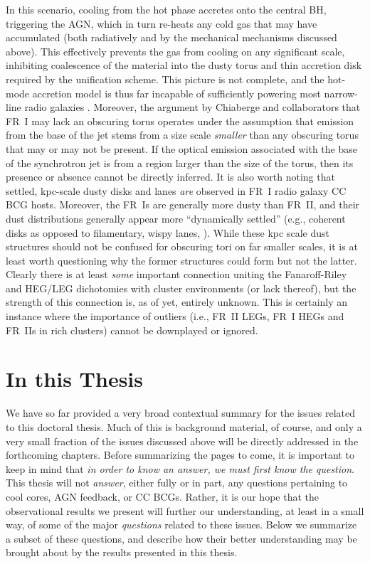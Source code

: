 In this scenario,  
cooling from the hot phase accretes onto the central BH, triggering the AGN, which in turn 
re-heats any cold gas that may have accumulated (both radiatively and by the mechanical mechanisms discussed above). 
This effectively prevents the gas from cooling on any significant scale, 
inhibiting coalescence of the material into the dusty torus and thin accretion disk required by the unification scheme. 
This picture is not complete, and the hot-mode accretion model is thus far incapable
of sufficiently powering most narrow-line radio galaxies \citep{hardcastle07}. 
Moreover, the argument by Chiaberge and collaborators that FR~I may lack an obscuring torus operates 
under the assumption that emission from the base of the jet stems from a size scale {\it smaller} than 
any obscuring torus that may or may not be present. If the optical emission associated with the base of the synchrotron jet is from a region larger than 
the size of the torus, then its presence or absence cannot be directly inferred.
It is also worth noting that settled, kpc-scale dusty disks and lanes {\it are} observed in FR~I 
radio galaxy CC BCG hosts. Moreover, the FR~Is are generally more dusty than FR~II, and their dust distributions 
generally appear more ``dynamically settled'' (e.g., coherent disks as opposed to filamentary, wispy lanes, \citealt{dekoff00,tremblay07}). 
While these kpc scale dust structures should not be confused for obscuring tori on far smaller scales, 
it is at least worth questioning why the former structures could form but not the latter. 
Clearly there is at least {\it some} important connection uniting the 
Fanaroff-Riley and HEG/LEG dichotomies with cluster environments (or lack thereof), 
but the strength of this connection is, as of yet, entirely unknown. This is certainly 
an instance where the importance of outliers (i.e., FR~II LEGs, FR~I HEGs and FR~IIs in rich clusters) cannot be downplayed or ignored. 




\section{In this Thesis}


We have so far provided a very broad contextual summary for the issues related
to this doctoral thesis. Much of this is background material, of course, and
only a very small fraction of the issues discussed above will be directly
addressed in the forthcoming chapters. Before summarizing the pages to come, it is important to keep in mind that {\it in order to know an 
answer,  we must first know the question}. This thesis will not
{\it answer}, either fully or in part, any questions pertaining to 
cool cores, AGN feedback, or CC BCGs. Rather, it is our hope that 
the observational results we present will further our understanding, 
at least in a small way, of some of the major {\it questions} related 
to these issues. Below we summarize a subset of these questions, 
and describe how their better understanding may be brought about 
by the results presented in this thesis.  \\



